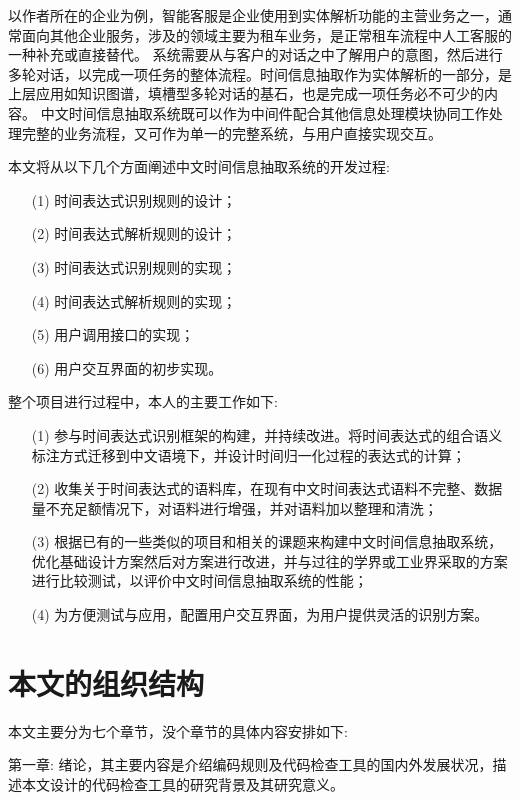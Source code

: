 以作者所在的企业为例，智能客服是企业使用到实体解析功能的主营业务之一，通常面向其他企业服务，涉及的领域主要为租车业务，是正常租车流程中人工客服的一种补充或直接替代。
系统需要从与客户的对话之中了解用户的意图，然后进行多轮对话，以完成一项任务的整体流程。时间信息抽取作为实体解析的一部分，是上层应用如知识图谱，填槽型多轮对话的基石，也是完成一项任务必不可少的内容。
中文时间信息抽取系统既可以作为中间件配合其他信息处理模块协同工作处理完整的业务流程，又可作为单一的完整系统，与用户直接实现交互。

本文将从以下几个方面阐述中文时间信息抽取系统的开发过程:
\begin{enumerate}
    \item[(1)] 时间表达式识别规则的设计；
    \item[(2)] 时间表达式解析规则的设计；
    \item[(3)] 时间表达式识别规则的实现；
    \item[(4)] 时间表达式解析规则的实现；
    \item[(5)] 用户调用接口的实现；
    \item[(6)] 用户交互界面的初步实现。
\end{enumerate}

整个项目进行过程中，本人的主要工作如下:
\begin{enumerate}
    \item[(1)] 参与时间表达式识别框架的构建，并持续改进。将时间表达式的组合语义标注方式迁移到中文语境下，并设计时间归一化过程的表达式的计算；
    \item[(2)] 收集关于时间表达式的语料库，在现有中文时间表达式语料不完整、数据量不充足额情况下，对语料进行增强，并对语料加以整理和清洗；
    \item[(3)] 根据已有的一些类似的项目和相关的课题来构建中文时间信息抽取系统，优化基础设计方案然后对方案进行改进，并与过往的学界或工业界采取的方案进行比较测试，以评价中文时间信息抽取系统的性能；
    \item[(4)] 为方便测试与应用，配置用户交互界面，为用户提供灵活的识别方案。
\end{enumerate}


\section{本文的组织结构}

本文主要分为七个章节，没个章节的具体内容安排如下:

第一章: 绪论，其主要内容是介绍编码规则及代码检查工具的国内外发展状况，描述本文设计的代码检查工具的研究背景及其研究意义。

